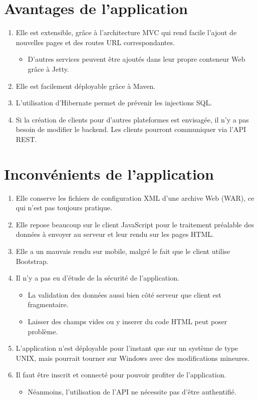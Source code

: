 \documentclass[11pt,a4paper,margin=0.5in]{report}
\begin{document}
\section{Avantages de l'application}
\begin{enumerate}
    \item Elle est extensible, grâce à l'architecture MVC qui rend facile l'ajout de nouvelles pages et des routes URL correspondantes.
    \begin{itemize}
        \item D'autres services peuvent être ajoutés dans leur propre conteneur Web grâce à Jetty.
    \end{itemize}
    \item Elle est facilement déployable grâce à Maven.
    \item L'utilisation d'Hibernate permet de prévenir les injections SQL.
    \item Si la création de clients pour d'autres plateformes est envisagée, il n'y a pas besoin de modifier le backend. Les clients pourront communiquer via l'API REST.
\end{enumerate}

\section{Inconvénients de l'application}
\begin{enumerate}
    \item Elle conserve les fichiers de configuration XML d'une archive Web (WAR), ce qui n'est pas toujours pratique.
    \item Elle repose beaucoup sur le client JavaScript pour le traitement préalable des données à envoyer au serveur et leur rendu sur les pages HTML.
    \item Elle a un mauvais rendu sur mobile, malgré le fait que le client utilise Bootstrap.
    \item Il n'y a pas eu d'étude de la sécurité de l'application.
        \begin{itemize}
            \item La validation des données aussi bien côté serveur que client est fragmentaire. 
            \item Laisser des champs vides ou y inserer du code HTML peut poser problème.
        \end{itemize}
    \item L'application n'est déployable pour l'instant que sur un système de type UNIX, mais pourrait tourner sur Windows avec des modifications mineures.
    \item Il faut être inscrit et connecté pour pouvoir profiter de l'application.
        \begin{itemize}
            \item Néanmoins, l'utilisation de l'API ne nécessite pas d'être authentifié. 
        \end{itemize}
\end{enumerate}
\end{document}
